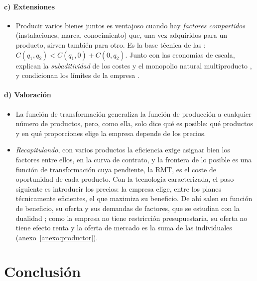 \documentclass[11pt]{article}
\begin{document}
\paragraph{c) Extensiones}

\begin{itemize}
\item Producir varios bienes juntos es ventajoso cuando hay \emph{factores compartidos} (instalaciones, marca, conocimiento) que, una vez adquiridos para un producto, sirven también para otro. Es la base técnica de las \nocite{PanzarWillig1981Economies}: $C(q_1,q_2)<C(q_1,0)+C(0,q_2)$. Junto con las economías de escala, explican la \emph{subaditividad} de los costes y el monopolio natural multiproducto  , y condicionan los límites de la empresa .
\end{itemize}

\paragraph{d) Valoración}

\begin{itemize}
\item La función de transformación generaliza la función de producción a cualquier número de productos, pero, como ella, solo dice qué es posible: qué productos y en qué proporciones elige la empresa depende de los precios.
\end{itemize}

\begin{itemize}
\item \emph{Recapitulando}, con varios productos la eficiencia exige asignar bien los factores entre ellos, en la curva de contrato, y la frontera de lo posible es una función de transformación cuya pendiente, la RMT, es el coste de oportunidad de cada producto. Con la tecnología caracterizada, el paso siguiente es introducir los precios: la empresa elige, entre los planes técnicamente eficientes, el que maximiza su beneficio. De ahí salen su función de beneficio, su oferta y sus demandas de factores, que se estudian con la dualidad ; como la empresa no tiene restricción presupuestaria, su oferta no tiene efecto renta y la oferta de mercado es la suma de las individuales (anexo~\ref{anexo:productor}).
\end{itemize}


\section*{Conclusión}
\end{document}
